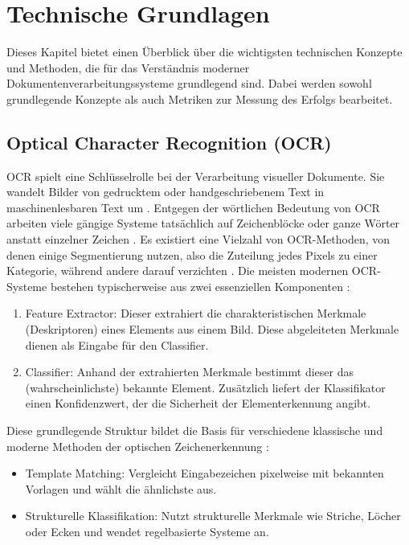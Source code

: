 \chapter{Technische Grundlagen}
\label{cha:technische-grundlagen}

Dieses Kapitel bietet einen Überblick über die wichtigsten technischen Konzepte und Methoden, die für das Verständnis moderner Dokumentenverarbeitungssysteme grundlegend sind. Dabei werden sowohl grundlegende Konzepte als auch Metriken zur Messung des Erfolgs bearbeitet. 

\section{Optical Character Recognition (OCR)}
\label{sec:optical-character-recognition-ocr}

\gls{OCR} spielt eine Schlüsselrolle bei der Verarbeitung visueller Dokumente. 
Sie wandelt Bilder von gedrucktem oder handgeschriebenem Text in maschinenlesbaren Text um \parencite{MoriS.1992HroO}.
Entgegen der wörtlichen Bedeutung von \gls{OCR} arbeiten viele gängige Systeme tatsächlich auf Zeichenblöcke oder ganze Wörter anstatt einzelner Zeichen \parencite{BorovikovEugene2014Asom}.
Es existiert eine Vielzahl von \gls{OCR}-Methoden, von denen einige Segmentierung nutzen, also die Zuteilung jedes Pixels zu einer Kategorie, während andere darauf verzichten \parencite{BorovikovEugene2014Asom}. 
Die meisten modernen \gls{OCR}-Systeme bestehen typischerweise aus zwei essenziellen Komponenten \parencite{BorovikovEugene2014Asom}:

\begin{enumerate}
	\item Feature Extractor: Dieser extrahiert die charakteristischen Merkmale (Deskriptoren) eines Elements aus einem Bild. Diese abgeleiteten Merkmale dienen als Eingabe für den Classifier.
	\item Classifier: Anhand der extrahierten Merkmale bestimmt dieser das (wahrscheinlichste) bekannte Element. Zusätzlich liefert der Klassifikator einen Konfidenzwert, der die Sicherheit der Elementerkennung angibt.
\end{enumerate}

Diese grundlegende Struktur bildet die Basis für verschiedene klassische und moderne Methoden der optischen Zeichenerkennung \parencite{BorovikovEugene2014Asom}:

\begin{itemize}
	\item Template Matching: Vergleicht Eingabezeichen pixelweise mit bekannten Vorlagen und wählt die ähnlichste aus.
	\item Strukturelle Klassifikation: Nutzt strukturelle Merkmale wie Striche, Löcher oder Ecken und wendet regelbasierte Systeme an.
\end{itemize}

